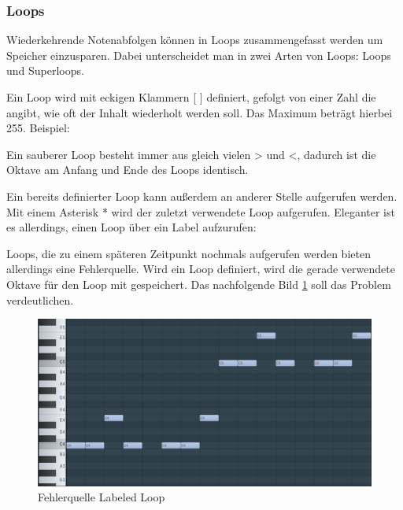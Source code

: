 \subsubsection{Loops}

Wiederkehrende Notenabfolgen können in Loops zusammengefasst werden um Speicher einzusparen. Dabei unterscheidet man in zwei Arten von Loops: Loops und Superloops.


Ein Loop wird mit eckigen Klammern [ ] definiert, gefolgt von einer Zahl die angibt, wie oft der Inhalt wiederholt werden soll. Das Maximum beträgt hierbei 255. Beispiel:

\medskip



\medskip

Ein sauberer Loop besteht immer aus gleich vielen > und <, dadurch ist die Oktave am Anfang und Ende des Loops identisch.

\bigskip

Ein bereits definierter Loop kann außerdem an anderer Stelle aufgerufen werden. Mit einem Asterisk \** wird der zuletzt verwendete Loop aufgerufen. Eleganter ist es allerdings, einen Loop über ein Label aufzurufen:

\medskip



\medskip


Loops, die zu einem späteren Zeitpunkt nochmals aufgerufen werden bieten allerdings eine Fehlerquelle. Wird ein Loop definiert, wird die gerade verwendete Oktave für den Loop mit gespeichert.
Das nachfolgende Bild \ref{LabeledLoop} soll das Problem verdeutlichen.

\begin{figure}[htbp] \centering
	\includegraphics[width=.95\linewidth]{images/LabeledLoop1.png}
	\caption{Fehlerquelle Labeled Loop}
	\label{LabeledLoop}
\end{figure}

